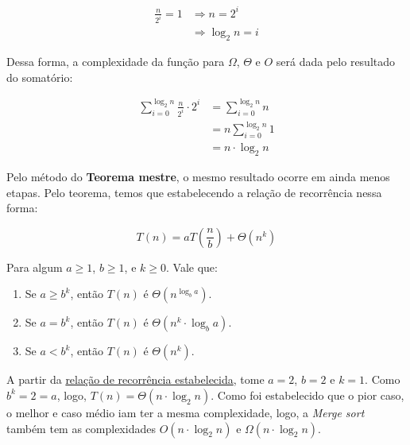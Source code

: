 \begin{align*}
	\frac{n}{2^i} = 1 & \Longrightarrow n = 2^i      \\
	                  & \Longrightarrow \log_2 n = i
\end{align*}

Dessa forma, a complexidade da função para $\Omega$, $\Theta$ e $O$ será dada pelo resultado do somatório:

\begin{align*}
	\sum_{i = 0}^{\log_2 n} \frac{n}{2^i} \cdot 2^i & = \sum_{i = 0}^{\log_2 n}n  \\
	                                                & = n\sum_{i = 0}^{\log_2 n}1 \\
	                                                & = n \cdot \log_2 n
\end{align*}


Pelo método do \textbf{Teorema mestre}, o mesmo resultado ocorre em ainda menos etapas. Pelo teorema, temos que estabelecendo a relação de recorrência nessa forma:

$$
	T(n) = aT\left(\frac{n}{b}\right) + \Theta\left(n^{k}\right)
$$

Para algum $a \geq 1$, $b \geq 1$, e $k \geq 0$. Vale que:

\begin{enumerate}
	\item Se $a \geq b^k$, então $T(n)$ é $\Theta(n^{\log_b a})$.
	\item Se $a = b^k$, então $T(n)$ é $\Theta(n^k \cdot \log_b a)$.
	\item Se $a < b^k$, então $T(n)$ é $\Theta(n^k)$.
\end{enumerate}

A partir da \href{recc:rec_merge_sort}{relação de recorrência estabelecida}, tome $a = 2$, $b = 2$ e $k = 1$. Como $b^k = 2 = a$, logo, $T(n) = \Theta(n \cdot \log_2 n)$. Como foi estabelecido que o pior caso, o melhor e caso médio iam ter a mesma complexidade, logo, a \textit{Merge sort} também tem as complexidades $O(n \cdot \log_2 n)$ e $\Omega(n \cdot \log_2 n)$.

